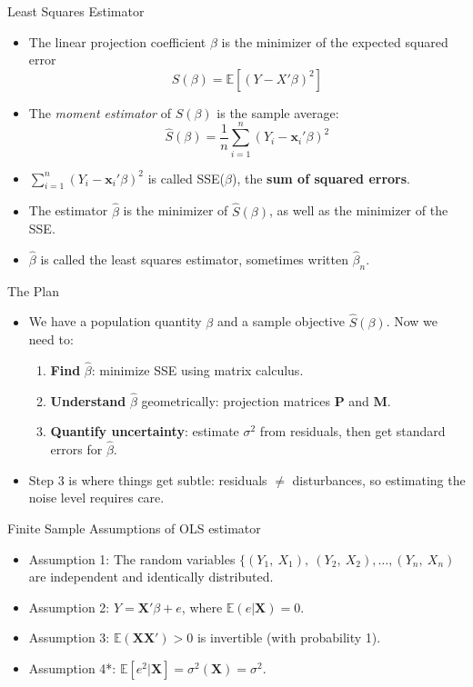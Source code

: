 \documentclass[aspectratio=169, handout]{beamer}
\numberwithin{equation}{section}
\begin{document}
\begin{frame}{Least Squares Estimator}
\begin{itemize}
\item The linear projection coefficient $\beta$ is the minimizer of the expected squared error 
$$S(\beta)=\mathbb{E}[(Y-X'\beta)^2]$$
\item The \emph{moment estimator} of $S(\beta)$ is the sample average:
$$\hat{S}(\beta)=\frac{1}{n}\sum_{i=1}^{n}(Y_i-\bm{x}_i'\beta)^2$$
\item $\sum_{i=1}^{n}(Y_i-\bm{x}_i'\beta)^2$ is called SSE($\beta$), the \textbf{sum of squared errors}.
\item The estimator $\hat{\beta}$ is the minimizer of $\hat{S}(\beta)$, as well as the minimizer of the SSE.
\item $\hat{\beta}$ is called the least squares estimator, sometimes written $\hat{\beta}_n$.
\end{itemize}
\end{frame}



\begin{frame}{The Plan}
\begin{itemize}
\item We have a population quantity $\beta$ and a sample objective $\hat{S}(\beta)$. Now we need to:
\begin{enumerate}
\item \textbf{Find} $\hat{\beta}$: minimize SSE using matrix calculus.\pause
\item \textbf{Understand} $\hat{\beta}$ geometrically: projection matrices $\bm{P}$ and $\bm{M}$.\pause
\item \textbf{Quantify uncertainty}: estimate $\sigma^2$ from residuals, then get standard errors for $\hat{\beta}$.
\end{enumerate}\pause
\item Step 3 is where things get subtle: residuals $\neq$ disturbances, so estimating the noise level requires care.
\end{itemize}
\end{frame}

\begin{frame}{Finite Sample Assumptions of OLS estimator}
\begin{itemize}
\item Assumption 1: The random variables $\{(Y_1,\ X_1),\ (Y_2,\ X_2), \ldots, (Y_n,\ X_n)$ are independent and identically distributed.
\item Assumption 2: $Y=\bm{X}'\beta+e$, where $\mathbb{E}(e|\bm{X})=0$. 
\item Assumption 3: $\mathbb{E}(\bm{X}\bm{X}')>0$ is invertible (with probability 1).
\item Assumption 4*: $\mathbb{E}[e^2|\bm{X}]=\sigma^2(\bm{X})=\sigma^2$. 
\end{itemize}
\end{frame}
\end{document}
